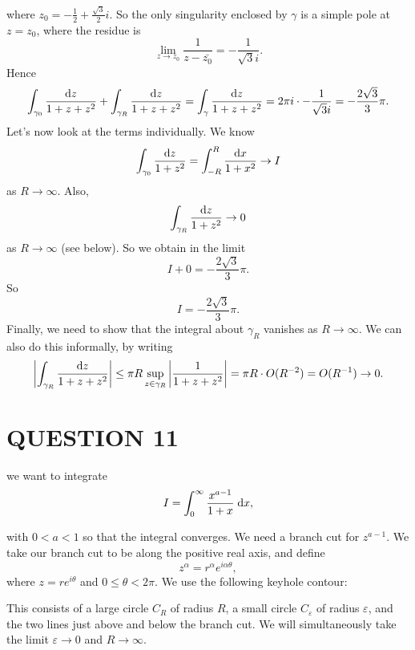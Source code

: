 \documentclass[a4paper]{article}
\begin{document}
where $ z_{0} = - \frac{1}{2} + \frac{\sqrt{3}}{2} i  $. So the only singularity enclosed by $\gamma$ is a simple pole at $z = z_{0}$, where the residue is
\[
\lim_{z \to z_{0}} \frac{1}{z - \bar{z_{0}}} = -\frac{1}{\sqrt{3}i} .
\]
Hence
\[
\int_{\gamma_0} \frac{\mathrm{d} z}{1 + z + z^2} + \int_{\gamma_R} \frac{\mathrm{d} z}{1 +z +  z^2} = \int_\gamma \frac{\mathrm{d} z}{1 + z + z^2}= 2\pi i \cdot -\frac{1}{\sqrt{3}i} = - \frac{2 \sqrt{3}}{3} \pi.
\]
Let's now look at the terms individually. We know
\[
\int_{\gamma_0} \frac{\mathrm{d} z}{1 + z^2} = \int_{-R}^R \frac{\mathrm{d} x}{1 + x^2} \to I
\]
as $R \to \infty$. Also,
\[
\int_{\gamma_R} \frac{\mathrm{d} z}{1 + z^2} \to 0
\]
as $R \to \infty$ (see below). So we obtain in the limit
\[
I + 0 = - \frac{2 \sqrt{3}}{3} \pi.
\]
So
\[
I = - \frac{2 \sqrt{3}}{3} \pi.
\]
Finally, we need to show that the integral about $\gamma_R$ vanishes as $R \to \infty$. We can also do this informally, by writing
\[
\left|\int_{\gamma_R} \frac{\mathrm{d} z}{1 + z + z^2}\right| \leq \pi R \sup_{z \in \gamma_R} \left|\frac{1}{1 + z + z^2}\right| = \pi R \cdot O(R^{-2}) = O(R^{-1}) \to 0.
\]


\section{QUESTION 11}

we want to integrate
\[
I = \int_0^\infty \frac{x^{a-1}}{1 +x}\;\mathrm{d} x,
\]

with $0 < a < 1$ so that the integral converges. 
 We need a branch cut for $z^{a-1}$. We take our branch cut to be along the positive real axis, and define
\[
z^\alpha = r^\alpha e^{i\alpha \theta},
\]
where $z = re^{i\theta}$ and $0 \leq \theta < 2\pi$. We use the following keyhole contour:
\begin{center}
\end{center}
This consists of a large circle $C_R$ of radius $R$, a small circle $C_\varepsilon$ of radius $\varepsilon$, and the two lines just above and below the branch cut. We will simultaneously take the limit $\varepsilon \to 0$ and $R \to \infty$.
\end{document}
